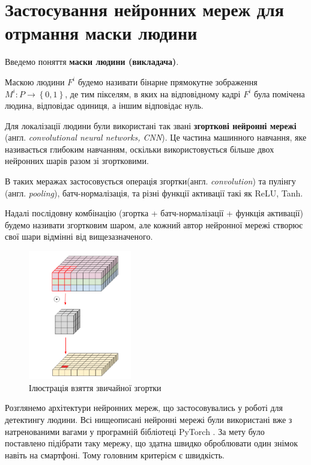 \section{Застосування нейронних мереж для отрмання маски людини}

Введемо поняття \textbf{маски людини (викладача)}.

Маскою людини \(F^{i}\) будемо називати бінарне прямокутне 
зображення \(M^{i}:P \rightarrow \left\{ 0,1 \right\}\), де тим
пікселям, в яких на відповідному кадрі \(F^{i}\) була помічена людина,
відповідає одиниця, а іншим відповідає нуль.


Для локалізації людини були використані так звані \textbf{згорткові нейронні мережі} 
(англ. \textit{convolutional neural networks, CNN}).
Це частина машинного навчання, яке називається глибоким навчанням, оскільки використовується 
більше двох нейронних шарів разом зі згортковими.

В таких меражах застосовується операція згортки(англ. \textit{convolution})
та пулінгу (англ. \textit{pooling}), батч-нормалізація, та різні функції 
активації такі як ReLU, Tanh.

Надалі послідовну комбінацію (згортка + батч-нормалізації + функція активації)
будемо називати згортковим шаром, але кожний автор нейронної мережі
створює свої шари відмінні від вищезазначеного. 

\begin{figure}[H]
    \centering
    \includegraphics[width=0.4\textwidth]{images/cnn_conv_operation}
    \caption{Ілюстрація взяття звичайної згортки  \cite{deep_wise_sep_conv_website}
    \label{fig:cnn:deep_wise_conv}
    }
\end{figure}

Розглянемо архітектури нейронних мереж, що застосовувались у роботі
для детектингу людини. Всі нищеописані нейронні мережі були використані вже з
натренованими вагами у програмній бібліотеці PyTorch \cite{NEURIPS2019_9015}.
За мету було поставлено підібрати таку мережу, що здатна швидко оброблювати 
один знімок навіть на смартфоні. Тому головним критерієм є швидкість.

